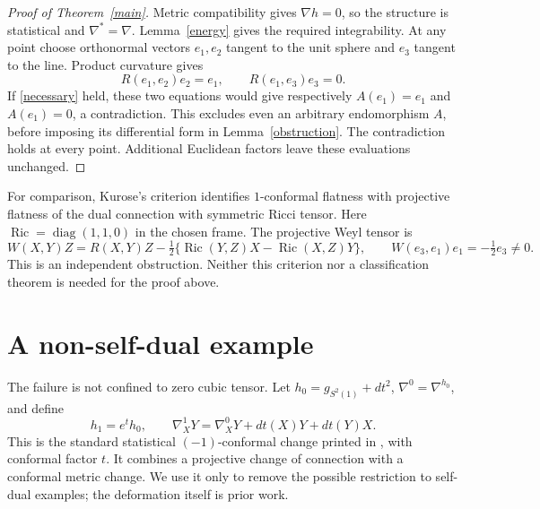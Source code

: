\documentclass[11pt]{article}
\newcommand{\Ric}{\operatorname{Ric}}
\begin{document}
\begin{proof}[Proof of Theorem~\ref{main}]
Metric compatibility gives $\nabla h=0$, so the structure is statistical
and $\nabla^*=\nabla$. Lemma~\ref{energy} gives the required integrability.
At any point choose orthonormal vectors $e_1,e_2$ tangent to the unit
sphere and $e_3$ tangent to the line. Product curvature gives
\[
R(e_1,e_2)e_2=e_1,\qquad R(e_1,e_3)e_3=0.
\]
If \eqref{necessary} held, these two equations would give respectively
$A(e_1)=e_1$ and $A(e_1)=0$, a contradiction. This excludes even an
arbitrary endomorphism $A$, before imposing its differential form in
Lemma~\ref{obstruction}. The contradiction holds at every point.
Additional Euclidean factors leave these evaluations unchanged.
\end{proof}

For comparison, Kurose's criterion \cite[Proposition~1]{Kurose} identifies
$1$-conformal flatness with projective flatness of the dual connection
with symmetric Ricci tensor. Here $\Ric=\operatorname{diag}(1,1,0)$
in the chosen frame. The projective Weyl tensor is
\[
W(X,Y)Z=R(X,Y)Z-\tfrac12\{\Ric(Y,Z)X-\Ric(X,Z)Y\},
\qquad W(e_3,e_1)e_1=-\tfrac12e_3\ne0.
\]
This is an independent obstruction. Neither this criterion nor a
classification theorem is needed for the proof above.

\section{A non-self-dual example}
The failure is not confined to zero cubic tensor. Let
$h_0=g_{S^2(1)}+dt^2$, $\nabla^0=\nabla^{h_0}$, and define
\begin{equation}\label{extension}
h_1=e^t h_0,\qquad
\nabla^1_XY=\nabla^0_XY+dt(X)Y+dt(Y)X.
\end{equation}
This is the standard statistical $(-1)$-conformal change printed in
\cite[p.~178, equation (2.1)]{Matsuzoe}, with conformal factor $t$.
It combines a projective change of connection with a conformal metric
change. We use it only to remove the possible restriction to self-dual
examples; the deformation itself is prior work.
\end{document}

